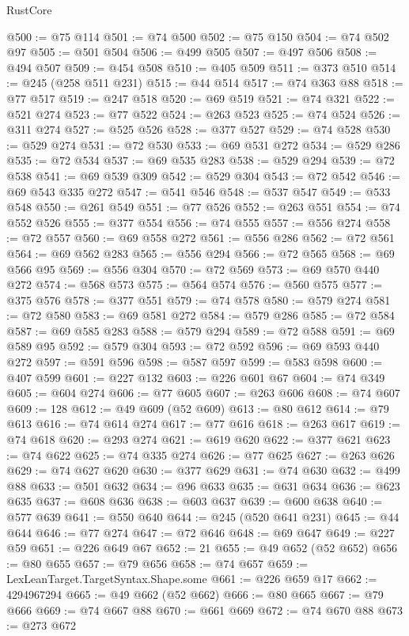 \begin{lexlean}{RustCore}
\begin{coremodule}
@500 := @75 @114
@501 := @74 @500
@502 := @75 @150
@504 := @74 @502 @97
@505 := @501 @504
@506 := @499 @505
@507 := @497 @506
@508 := @494 @507
@509 := @454 @508
@510 := @405 @509
@511 := @373 @510
@514 := @245 (@258 @511 @231)
@515 := @44 @514
@517 := @74 @363 @88
@518 := @77 @517
@519 := @247 @518
@520 := @69 @519
@521 := @74 @321
@522 := @521 @274
@523 := @77 @522
@524 := @263 @523
@525 := @74 @524
@526 := @311 @274
@527 := @525 @526
@528 := @377 @527
@529 := @74 @528
@530 := @529 @274
@531 := @72 @530
@533 := @69 @531 @272
@534 := @529 @286
@535 := @72 @534
@537 := @69 @535 @283
@538 := @529 @294
@539 := @72 @538
@541 := @69 @539 @309
@542 := @529 @304
@543 := @72 @542
@546 := @69 @543 @335 @272
@547 := @541 @546
@548 := @537 @547
@549 := @533 @548
@550 := @261 @549
@551 := @77 @526
@552 := @263 @551
@554 := @74 @552 @526
@555 := @377 @554
@556 := @74 @555
@557 := @556 @274
@558 := @72 @557
@560 := @69 @558 @272
@561 := @556 @286
@562 := @72 @561
@564 := @69 @562 @283
@565 := @556 @294
@566 := @72 @565
@568 := @69 @566 @95
@569 := @556 @304
@570 := @72 @569
@573 := @69 @570 @440 @272
@574 := @568 @573
@575 := @564 @574
@576 := @560 @575
@577 := @375 @576
@578 := @377 @551
@579 := @74 @578
@580 := @579 @274
@581 := @72 @580
@583 := @69 @581 @272
@584 := @579 @286
@585 := @72 @584
@587 := @69 @585 @283
@588 := @579 @294
@589 := @72 @588
@591 := @69 @589 @95
@592 := @579 @304
@593 := @72 @592
@596 := @69 @593 @440 @272
@597 := @591 @596
@598 := @587 @597
@599 := @583 @598
@600 := @407 @599
@601 := @227 @132
@603 := @226 @601 @67
@604 := @74 @349
@605 := @604 @274
@606 := @77 @605
@607 := @263 @606
@608 := @74 @607
@609 := 128
@612 := @49 @609 (@52 @609)
@613 := @80 @612
@614 := @79 @613
@616 := @74 @614 @274
@617 := @77 @616
@618 := @263 @617
@619 := @74 @618
@620 := @293 @274
@621 := @619 @620
@622 := @377 @621
@623 := @74 @622
@625 := @74 @335 @274
@626 := @77 @625
@627 := @263 @626
@629 := @74 @627 @620
@630 := @377 @629
@631 := @74 @630
@632 := @499 @88
@633 := @501 @632
@634 := @96 @633
@635 := @631 @634
@636 := @623 @635
@637 := @608 @636
@638 := @603 @637
@639 := @600 @638
@640 := @577 @639
@641 := @550 @640
@644 := @245 (@520 @641 @231)
@645 := @44 @644
@646 := @77 @274
@647 := @72 @646
@648 := @69 @647
@649 := @227 @59
@651 := @226 @649 @67
@652 := 21
@655 := @49 @652 (@52 @652)
@656 := @80 @655
@657 := @79 @656
@658 := @74 @657
@659 := LexLeanTarget.TargetSyntax.Shape.some
@661 := @226 @659 @17
@662 := 4294967294
@665 := @49 @662 (@52 @662)
@666 := @80 @665
@667 := @79 @666
@669 := @74 @667 @88
@670 := @661 @669
@672 := @74 @670 @88
@673 := @273 @672

\end{coremodule}
\end{lexlean}
